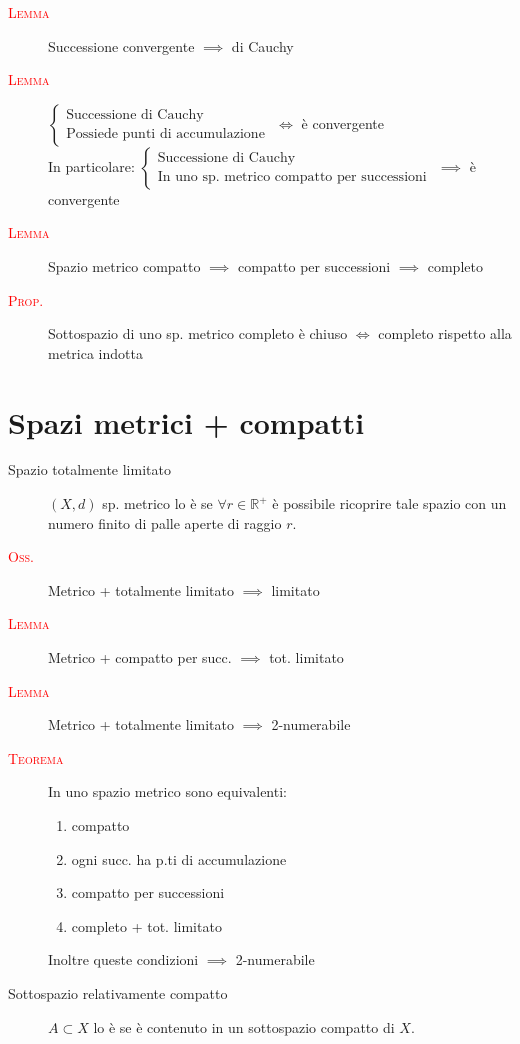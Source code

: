 \documentclass[a4paper,10pt]{article}
\newcommand{\myth}{\normalfont \scshape \textcolor{red}}
\theoremstyle{remark}
\theoremstyle{definition}
\begin{document}
\begin{description}
    \item[\myth{Lemma}] Successione convergente $\implies$ di Cauchy


\item[\myth{Lemma}]
    $\begin{cases}
        \mbox{Successione di Cauchy} \\
        \mbox{Possiede punti di accumulazione}
    \end{cases}$
    $\iff$ è convergente \\
    In particolare: 
    $\begin{cases}
        \mbox{Successione di Cauchy} \\
        \mbox{In uno sp. metrico compatto per successioni}
    \end{cases}$
    $\implies$ è convergente \\


\item[\myth{Lemma}] Spazio metrico compatto $\implies$ compatto per successioni $\implies$ completo

\item[\myth{Prop.}]Sottospazio di uno sp. metrico completo è chiuso $\iff$ completo rispetto alla metrica indotta

\end{description}

\section*{Spazi metrici + compatti}
\begin{description}
    \item[Spazio totalmente limitato] $(X,d)$ sp. metrico lo è se $\forall r \in \mathbb{R}^+$ è possibile ricoprire tale spazio con un numero finito di palle aperte di  raggio $r$.
    \item[\myth{Oss.}] Metrico + totalmente limitato $\implies$ limitato
    \item[\myth{Lemma}] Metrico + compatto per succ. $\implies$ tot. limitato
    \item[\myth{Lemma}] Metrico + totalmente limitato $\implies$ 2-numerabile
    \item[\myth{Teorema}] In uno spazio metrico sono equivalenti:
    \begin{enumerate}
        \item compatto
        \item ogni succ. ha p.ti di accumulazione
        \item compatto per successioni
        \item completo + tot. limitato
    \end{enumerate}
    Inoltre queste condizioni $\implies$ 2-numerabile
    \item[Sottospazio relativamente compatto] $A \subset X$ lo è se è contenuto in un sottospazio compatto di $X$.
\end{description}
\end{document}
